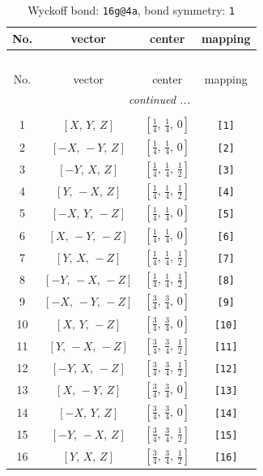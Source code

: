 \documentclass[fleqn,8pt]{jsarticle}
\begin{document}
\begin{longtable}{cccc}
\caption{Wyckoff bond: {\tt 16g@4a}, bond symmetry: {\tt 1}}
 \\
 \hline \hline
No. & vector & center & mapping \\ \hline \endfirsthead

\multicolumn{3}{l}{\tablename\ \thetable{}} \\
 \hline \hline
No. & vector & center & mapping \\ \hline \endhead

 \hline \hline
\multicolumn{3}{r}{\footnotesize\it continued ...} \\ \endfoot

 \hline \hline
\multicolumn{3}{r}{} \\ \endlastfoot

1 & $\left[ X,\, Y,\, Z \right]$ & $\left[ \frac{1}{4},\, \frac{1}{4},\, 0 \right]$ & {\tt [1]} \\ \hline
2 & $\left[ - X,\, - Y,\, Z \right]$ & $\left[ \frac{1}{4},\, \frac{1}{4},\, 0 \right]$ & {\tt [2]} \\ \hline
3 & $\left[ - Y,\, X,\, Z \right]$ & $\left[ \frac{1}{4},\, \frac{1}{4},\, \frac{1}{2} \right]$ & {\tt [3]} \\ \hline
4 & $\left[ Y,\, - X,\, Z \right]$ & $\left[ \frac{1}{4},\, \frac{1}{4},\, \frac{1}{2} \right]$ & {\tt [4]} \\ \hline
5 & $\left[ - X,\, Y,\, - Z \right]$ & $\left[ \frac{1}{4},\, \frac{1}{4},\, 0 \right]$ & {\tt [5]} \\ \hline
6 & $\left[ X,\, - Y,\, - Z \right]$ & $\left[ \frac{1}{4},\, \frac{1}{4},\, 0 \right]$ & {\tt [6]} \\ \hline
7 & $\left[ Y,\, X,\, - Z \right]$ & $\left[ \frac{1}{4},\, \frac{1}{4},\, \frac{1}{2} \right]$ & {\tt [7]} \\ \hline
8 & $\left[ - Y,\, - X,\, - Z \right]$ & $\left[ \frac{1}{4},\, \frac{1}{4},\, \frac{1}{2} \right]$ & {\tt [8]} \\ \hline
9 & $\left[ - X,\, - Y,\, - Z \right]$ & $\left[ \frac{3}{4},\, \frac{3}{4},\, 0 \right]$ & {\tt [9]} \\ \hline
10 & $\left[ X,\, Y,\, - Z \right]$ & $\left[ \frac{3}{4},\, \frac{3}{4},\, 0 \right]$ & {\tt [10]} \\ \hline
11 & $\left[ Y,\, - X,\, - Z \right]$ & $\left[ \frac{3}{4},\, \frac{3}{4},\, \frac{1}{2} \right]$ & {\tt [11]} \\ \hline
12 & $\left[ - Y,\, X,\, - Z \right]$ & $\left[ \frac{3}{4},\, \frac{3}{4},\, \frac{1}{2} \right]$ & {\tt [12]} \\ \hline
13 & $\left[ X,\, - Y,\, Z \right]$ & $\left[ \frac{3}{4},\, \frac{3}{4},\, 0 \right]$ & {\tt [13]} \\ \hline
14 & $\left[ - X,\, Y,\, Z \right]$ & $\left[ \frac{3}{4},\, \frac{3}{4},\, 0 \right]$ & {\tt [14]} \\ \hline
15 & $\left[ - Y,\, - X,\, Z \right]$ & $\left[ \frac{3}{4},\, \frac{3}{4},\, \frac{1}{2} \right]$ & {\tt [15]} \\ \hline
16 & $\left[ Y,\, X,\, Z \right]$ & $\left[ \frac{3}{4},\, \frac{3}{4},\, \frac{1}{2} \right]$ & {\tt [16]} \\
\end{longtable}
\end{document}
